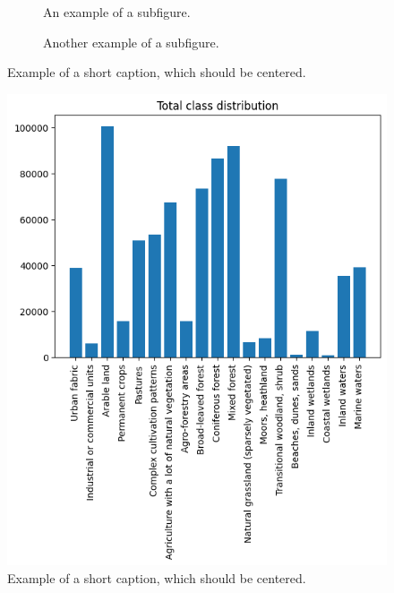 \begin{figure}
    \centering
    \begin{subfigure}{0.68\linewidth}
      \fbox{\rule{0pt}{2in} \rule{.9\linewidth}{0pt}}
      \caption{An example of a subfigure.}
      \label{fig:short-a}
    \end{subfigure}
    \hfill
    \begin{subfigure}{0.28\linewidth}
      \fbox{\rule{0pt}{2in} \rule{.9\linewidth}{0pt}}
      \caption{Another example of a subfigure.}
      \label{fig:short-b}
    \end{subfigure}
    \caption{Example of a short caption, which should be centered.}
    \label{fig:short}
  \end{figure}


  \begin{figure}
    \centering
    \includegraphics[width=\linewidth]{images/class_distribution.png}
    \caption{Example of a short caption, which should be centered.}
    \label{fig:short}
  \end{figure}